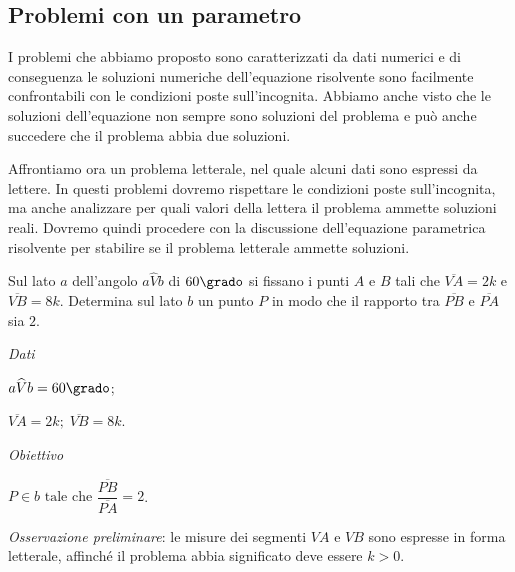 \vspazio\ovalbox{\ref{ese:3.162}, \ref{ese:3.163}, \ref{ese:3.164}, \ref{ese:3.165}, \ref{ese:3.166}, \ref{ese:3.167}, \ref{ese:3.168}, \ref{ese:3.169},\ref{ese:3.159}, \ref{ese:3.160}, \ref{ese:3.161},}

\subsection{Problemi con un parametro}

I problemi che abbiamo proposto sono caratterizzati da dati numerici e di conseguenza le soluzioni numeriche dell'equazione risolvente sono facilmente
confrontabili con le condizioni poste sull'incognita. Abbiamo anche visto che le soluzioni dell'equazione non sempre sono soluzioni del problema e
può anche succedere che il problema abbia due soluzioni.

Affrontiamo ora un problema letterale, nel quale alcuni dati sono espressi da lettere. In questi problemi dovremo rispettare le condizioni poste sull'incognita, ma anche analizzare per quali valori della lettera il problema ammette soluzioni reali. Dovremo quindi procedere con la discussione dell'equazione parametrica risolvente per stabilire se il problema letterale ammette soluzioni.

\begin{problema}
Sul lato $ a $ dell'angolo $ a \widehat{V} b $ di $ 60\grado $ si fissano i punti $ A $ e $ B $ tali che $ \overline{VA} = 2 k $ e $ \overline {VB} = 8 k $.
Determina sul lato $ b $ un punto $ P $ in modo che il rapporto tra $\overline{PB}$ e $\overline{PA}$ sia $2$.
\end{problema}

\begin{multicols}{2}
\emph{Dati}

$a \widehat{V} b = 60\grado$;

$\overline {VA} = 2 k; \;
 \overline {VB} = 8 k $.

\emph{Obiettivo}

$P \in b \text{ tale che } \dfrac{\overline{PB}}{\overline{PA}} = 2$.
\begin{center}
 
\end{center}

\end{multicols}
\emph{Osservazione preliminare}: le misure dei segmenti $ VA $ e $ VB $ sono espresse in forma letterale, affinché il problema abbia significato deve essere
$k > 0$.

